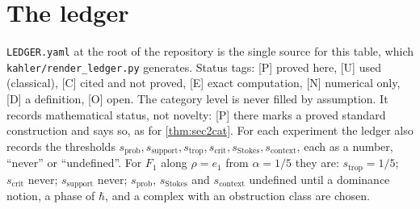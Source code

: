 \documentclass[11pt]{article}
\theoremstyle{definition}\newtheorem{definition}[theorem]{Definition}\newtheorem{remark}[theorem]{Remark}\newtheorem{example}[theorem]{Example}\newtheorem{problem}[theorem]{Open problem}\crefname{problem}{Problem}{Problems}
\begin{document}
\appendix
\section{The ledger}\label{app:ledger}
\texttt{LEDGER.yaml} at the root of the repository is the single source for this table, which \texttt{kahler/render\_ledger.py} generates. Status tags: [P] proved
here, [U] used (classical), [C] cited and not proved, [E] exact computation, [N] numerical only, [D] a definition, [O] open. The category level is never
filled by assumption. It records mathematical status, not novelty: [P] there marks a proved standard construction and says so, as for \cref{thm:sec2cat}. For each experiment the ledger also records the thresholds $s_{\mathrm{prob}},s_{\mathrm{support}},s_{\mathrm{trop}},s_{\mathrm{crit}},s_{\mathrm{Stokes}},s_{\mathrm{context}}$, each as a number, ``never'' or ``undefined''. For $F_1$ along $\rho=e_1$
from $\alpha=1/5$ they are: $s_{\mathrm{trop}}=1/5$; $s_{\mathrm{crit}}$ never; $s_{\mathrm{support}}$ never; $s_{\mathrm{prob}}$, $s_{\mathrm{Stokes}}$ and $s_{\mathrm{context}}$ undefined until a dominance notion, a phase of $\hbar$, and a complex
with an obstruction class are chosen.

\end{document}
